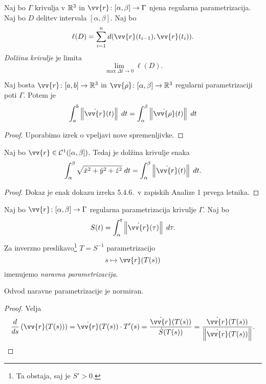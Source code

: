 \begin{definicija}
Naj bo $\Gamma$ krivulja v $\mathbb{R}^3$ in
$\vv{r} \colon [\alpha, \beta] \to \Gamma$ njena regularna
parametrizacija. Naj bo $D$ delitev intervala $[\alpha, \beta]$.
Naj bo
\[
\ell(D) =
\sum_{i=1}^n d(\vv{r}(t_{i-1}),\vv{r}(t_i)).
\]
\emph{Dolžina krivulje} je limita
\[
\lim_{\max \Delta t \to 0} \ell(D).
\]
\end{definicija}

\begin{trditev}
Naj bosta $\vv{r}\colon[a,b]\to\R^3$ in
$\vv{\rho}\colon[\alpha,\beta]\to\R^3$ regularni parametrizaciji
poti $\Gamma$. Potem je
\[
\int_a^b \norm{\dot{\vv{r}}(t)}\;dt =
\int_\alpha^\beta \norm{\dot{\vv{\rho}}(t)}\;dt
\]
\end{trditev}

\begin{proof}
Uporabimo izrek o vpeljavi nove spremenljivke.
\end{proof}

\begin{trditev}
Naj bo $\vv{r} \in \mathcal{C}^1([\alpha, \beta])$. Tedaj je
dolžina krivulje enaka
\[
\int_\alpha^\beta \sqrt{\dot{x}^2 + \dot{y}^2 + \dot{z}^2}\;dt =
\int_\alpha^\beta \norm{\dot{\vv{r}}(t)}\;dt.
\]
\end{trditev}

\begin{proof}
Dokaz je enak dokazu izreka 5.4.6.\ v zapiskih Analize 1 prvega
letnika.
\end{proof}

\begin{definicija}
Naj bo $\vv{r} \colon [\alpha, \beta] \to \Gamma$ regularna
parametrizacija krivulje $\Gamma$. Naj bo
\[
S(t) = \int_\alpha^t \norm{\dot{\vv{r}}(\tau)}\;d\tau.
\]
Za inverzno preslikavo\footnote{Ta obstaja, saj je $S' > 0$.}
$T=S^{-1}$ parametrizacijo
\[
s \mapsto \vv{r}(T(s))
\]
imenujemo
\emph{naravna parametrizacija}.
\end{definicija}

\begin{trditev}
Odvod naravne parametrizacije je normiran.
\end{trditev}

\begin{proof}
Velja
\[
\frac{d}{ds} \left(\vv{r}(T(s))\right) =
\dot{\vv{r}}(T(s)) \cdot T'(s) =
\frac{\dot{\vv{r}}(T(s))}{\dot{S}(T(s))} =
\frac{\dot{\vv{r}}(T(s))}{\norm{\dot{\vv{r}}(T(s))}}. \qedhere
\]
\end{proof}

